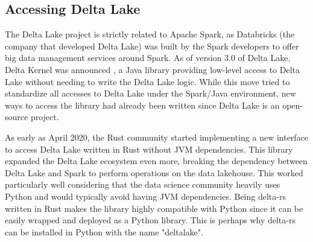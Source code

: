 \subsection{Accessing Delta Lake}
\label{subsec:delta_lake_access}

The Delta Lake project is strictly related to Apache Spark, as Databricks (the company that developed Delta Lake) was built by the Spark developers \cite{zaharia2010spark} to offer big data management services around Spark. As of version 3.0 of Delta Lake, Delta Kernel was announced \cite{AnnouncingDeltaLake2023}, a Java library providing low-level access to Delta Lake without needing to write the Delta Lake logic. While this move tried to standardize all accesses to Delta Lake under the Spark/Java environment, new ways to access the library had already been written since Delta Lake is an open-source project.

As early as April 2020, the Rust community started implementing a new interface to access Delta Lake written in Rust without \gls{JVM} dependencies. This library expanded the Delta Lake ecosystem even more, breaking the dependency between Delta Lake and Spark to perform operations on the data lakehouse. This worked particularly well considering that the data science community heavily uses Python and would typically avoid having \gls{JVM} dependencies. Being delta-rs written in Rust makes the library highly compatible with Python since it can be easily wrapped and deployed as a Python library. This is perhaps why delta-rs can be installed in Python with the name "deltalake".